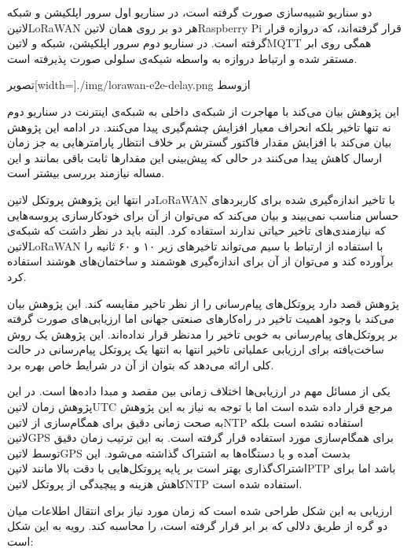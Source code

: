 دو سناریو شبیه‌سازی صورت گرفته است، در سناریو اول سرور اپلکیشن و شبکه ‌لاتین{LoRaWAN} هر دو بر روی همان ‌لاتین{Raspberry Pi}
قرار گرفته‌اند، که دروازه قرار گرفته است. در سناریو دوم سرور اپلکیشن، شبکه و ‌لاتین{MQTT} همگی روی ابر مستقر شده و ارتباط
دروازه به واسطه شبکه‌ی سلولی صورت پذیرفته است.

‌تصویر[width=\textwidth]{./img/lorawan-e2e-delay.png}
‌ازوسط

این پژوهش بیان می‌کند با مهاجرت از شبکه‌ی داخلی به شبکه‌ی اینترنت در سناریو دوم نه تنها تاخیر بلکه انحراف معیار افزایش چشم‌گیری
پیدا می‌کنند. در ادامه این پژوهش بیان می‌کند با افزایش مقدار فاکتور گسترش بر خلاف انتظار پارامترهایی به جز زمان ارسال کاهش پیدا می‌کنند
در حالی که پیش‌بینی این مقدارها ثابت باقی بمانند و این مساله نیازمند بررسی بیشتر است.

در انتها این پژوهش پروتکل ‌لاتین{LoRaWAN} با تاخیر اندازه‌گیری شده برای کاربردهای حساس مناسب نمی‌بیند و بیان می‌کند که می‌توان از آن
برای خودکارسازی پروسه‌هایی که نیازمندی‌های تاخیر حیاتی ندارند استفاده کرد. البته باید در نظر داشت که شبکه‌ی ‌لاتین{LoRaWAN} با استفاده از
ارتباط با سیم می‌تواند تاخیرهای زیر ۱۰ و ۶۰ ثانیه را برآورده کند و می‌توان از آن برای اندازه‌گیری هوشمند و ساختمان‌های هوشند استفاده کرد.


پژوهش  قصد دارد پروتکل‌های پیام‌رسانی را از نظر تاخیر مقایسه کند. این پژوهش بیان می‌کند با وجود اهمیت تاخیر در راه‌کارهای صنعتی جهانی اما ارزیابی‌های صورت گرفته بر
پروتکل‌های پیام‌رسانی به خوبی تاخیر را مدنظر قرار نداده‌اند. این پژوهش یک روش ساخت‌یافته برای ارزیابی عملیاتی تاخیر انتها به انتها یک پروتکل پیام‌رسانی در حالت کلی ارائه می‌دهد که بتوان از آن
در شرایط خاص بهره برد.

یکی از مسائل مهم در ارزیابی‌ها اختلاف زمانی بین مقصد و مبدا داده‌ها است. در این پژوهش زمان ‌لاتین{UTC} مرجع قرار داده شده است اما با توجه به نیاز به این پژوهش به صحت زمانی دقیق
برای همگام‌سازی از ‌لاتین{NTP} استفاده نشده است بلکه ‌لاتین{GPS} برای همگام‌سازی مورد استفاده قرار گرفته است.
به این ترتیب زمان دقیق توسط ‌لاتین{GPS} بدست آمده و با دستگاه‌ها به اشتراک گذاشته می‌شود. این اشتراک‌گذاری بهتر است بر پایه پروتکل‌هایی با دقت بالا مانند ‌لاتین{PTP} باشد اما
برای کاهش هزینه و پیچیدگی از پروتکل ‌لاتین{NTP} استفاده شده است.

ارزیابی به این شکل طراحی شده است که زمان مورد نیاز برای انتقال اطلاعات میان دو گره از طریق دلالی که بر ابر قرار گرفته است، را محاسبه کند.
رویه به این شکل است:

